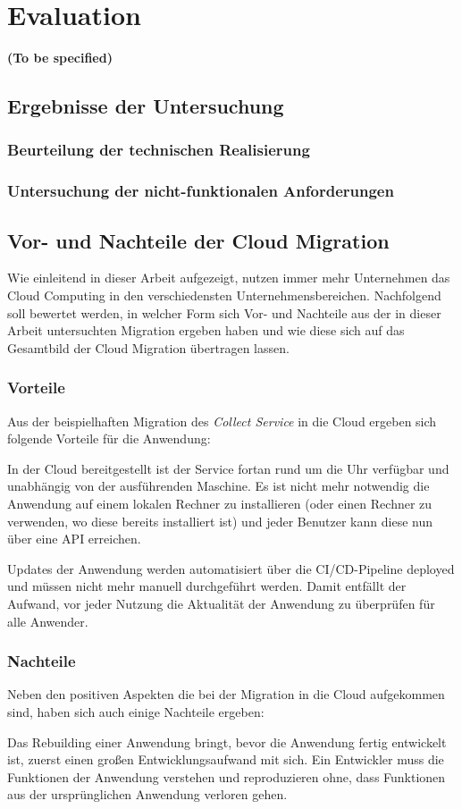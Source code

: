 \chapter{Evaluation}
\textbf{(To be specified)}

\section{Ergebnisse der Untersuchung}
\subsection{Beurteilung der technischen Realisierung}
\subsection{Untersuchung der nicht-funktionalen Anforderungen}


\section{Vor- und Nachteile der Cloud Migration}
Wie einleitend in dieser Arbeit aufgezeigt, nutzen immer mehr Unternehmen das Cloud Computing in den verschiedensten Unternehmensbereichen. Nachfolgend soll bewertet werden, in welcher Form sich Vor- und Nachteile aus der in dieser Arbeit untersuchten Migration ergeben haben und wie diese sich auf das Gesamtbild der Cloud Migration übertragen lassen.

\subsection{Vorteile}
Aus der beispielhaften Migration des \textit{Collect Service} in die Cloud ergeben sich folgende Vorteile für die Anwendung:

In der Cloud bereitgestellt ist der Service fortan rund um die Uhr verfügbar und unabhängig von der ausführenden Maschine. Es ist nicht mehr notwendig die Anwendung auf einem lokalen Rechner zu installieren (oder einen Rechner zu verwenden, wo diese bereits installiert ist) und jeder Benutzer kann diese nun über eine \ac{API} erreichen.

Updates der Anwendung werden automatisiert über die \ac{CI/CD}-Pipeline deployed und müssen nicht mehr manuell durchgeführt werden. Damit entfällt der Aufwand, vor jeder Nutzung die Aktualität der Anwendung zu überprüfen für alle Anwender.
\pagebreak

\subsection{Nachteile}
Neben den positiven Aspekten die bei der Migration in die Cloud aufgekommen sind, haben sich auch einige Nachteile ergeben:

Das Rebuilding einer Anwendung bringt, bevor die Anwendung fertig entwickelt ist, zuerst einen großen Entwicklungsaufwand mit sich. Ein Entwickler muss die Funktionen der Anwendung verstehen und reproduzieren ohne, dass Funktionen aus der ursprünglichen Anwendung verloren gehen.
\pagebreak